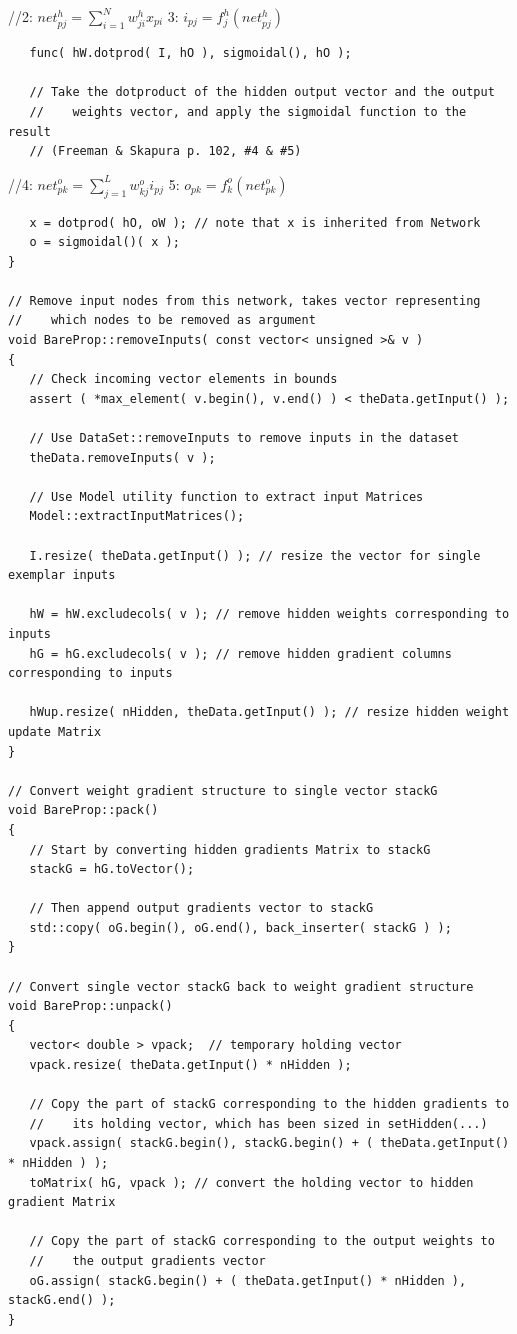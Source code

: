 \documentclass{report}[10pt]
\begin{document}
\hspace{12 pt}//\hspace{4 pt}2: $net^h_{pj}=\sum_{i=1}^Nw^h_{ji}x_{pi}$
3: $i_{pj}=f_j^h(net^h_{pj})$
\begin{verbatim}
   func( hW.dotprod( I, hO ), sigmoidal(), hO );

   // Take the dotproduct of the hidden output vector and the output
   //    weights vector, and apply the sigmoidal function to the result
   // (Freeman & Skapura p. 102, #4 & #5)
\end{verbatim}
\hspace{12 pt}//\hspace{4 pt}4: $net^o_{pk}=\sum_{j=1}^Lw^o_{kj}i_{pj}$
5: $o_{pk}=f_k^o(net^o_{pk})$
\begin{verbatim}
   x = dotprod( hO, oW ); // note that x is inherited from Network
   o = sigmoidal()( x );
}

// Remove input nodes from this network, takes vector representing
//    which nodes to be removed as argument
void BareProp::removeInputs( const vector< unsigned >& v )
{
   // Check incoming vector elements in bounds   
   assert ( *max_element( v.begin(), v.end() ) < theData.getInput() );

   // Use DataSet::removeInputs to remove inputs in the dataset
   theData.removeInputs( v );

   // Use Model utility function to extract input Matrices
   Model::extractInputMatrices();

   I.resize( theData.getInput() ); // resize the vector for single exemplar inputs

   hW = hW.excludecols( v ); // remove hidden weights corresponding to inputs
   hG = hG.excludecols( v ); // remove hidden gradient columns corresponding to inputs 
   
   hWup.resize( nHidden, theData.getInput() ); // resize hidden weight update Matrix
}

// Convert weight gradient structure to single vector stackG
void BareProp::pack()
{
   // Start by converting hidden gradients Matrix to stackG
   stackG = hG.toVector();

   // Then append output gradients vector to stackG
   std::copy( oG.begin(), oG.end(), back_inserter( stackG ) );   
}

// Convert single vector stackG back to weight gradient structure
void BareProp::unpack()
{
   vector< double > vpack;  // temporary holding vector
   vpack.resize( theData.getInput() * nHidden );
   
   // Copy the part of stackG corresponding to the hidden gradients to
   //    its holding vector, which has been sized in setHidden(...)
   vpack.assign( stackG.begin(), stackG.begin() + ( theData.getInput() * nHidden ) );
   toMatrix( hG, vpack ); // convert the holding vector to hidden gradient Matrix

   // Copy the part of stackG corresponding to the output weights to
   //    the output gradients vector
   oG.assign( stackG.begin() + ( theData.getInput() * nHidden ), stackG.end() );   
}\end{verbatim}
\end{document}
